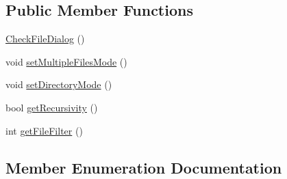 \subsection*{Public Member Functions}
\begin{DoxyCompactItemize}
\item 
\hyperlink{class_check_file_dialog_a85e17297502cb15ef71df1cf747f6454}{Check\+File\+Dialog} ()
\item 
void \hyperlink{class_check_file_dialog_a658bf64019f6bb361e5e5d043e457c4a}{set\+Multiple\+Files\+Mode} ()
\item 
void \hyperlink{class_check_file_dialog_a4e32af3b8b068ec4e5b8f8005239e90b}{set\+Directory\+Mode} ()
\item 
bool \hyperlink{class_check_file_dialog_a8129e12b60b491d22467e50258af4e38}{get\+Recursivity} ()
\item 
int \hyperlink{class_check_file_dialog_aae56141a35759268fe0143386d3258d9}{get\+File\+Filter} ()
\end{DoxyCompactItemize}


\subsection{Member Enumeration Documentation}
\hypertarget{class_check_file_dialog_aef425279166ddf0cec2e153d80893e80}{}
